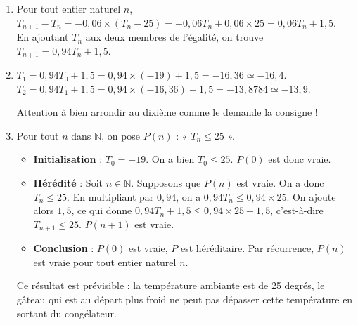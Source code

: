 \documentclass[11pt,fleqn, openany]{book} %
\begin{document}
\begin{solution}\hspace{0pt}
\begin{enumerate}
\item Pour tout entier naturel $n$,$ T_{n+1} - T_n = -0,06 \times (T_n - 25)=-0,06T_n+0,06 \times 25 = 0,06T_n+1,5$.\\
En ajoutant $T_n$ aux deux membres de l'égalité, on trouve $T_{n+1}=0,94T_n+1,5$.
\item $T_1=0,94T_0+1,5=0,94 \times (-19) +1,5=-16,36 \simeq -16,4$. \\ $T_2=0,94T_1+1,5=0,94 \times (-16,36)+1,5=-13,8784\simeq -13,9$.

Attention à bien arrondir au dixième comme le demande la consigne !

\item Pour tout $n$ dans $\mathbb{N}$, on pose $P(n)$ : « $T_n \leqslant 25$ ».

\begin{itemize}
\item \textbf{Initialisation} : $T_0=-19$. On a bien $T_0 \leqslant 25$. $P(0)$ est donc vraie.
\item \textbf{Hérédité} : Soit $n\in\mathbb{N}$. Supposons que $P(n)$ est vraie. On a donc $T_n \leqslant 25$. En multipliant par $0,94$, on a $0,94T_n \leqslant 0,94 \times 25$. On ajoute alors $1,5$, ce qui donne $0,94T_n +1,5\leqslant 0,94 \times 25+1,5$, c'est-à-dire $T_{n+1}\leqslant 25$. $P(n+1)$ est vraie.
\item \textbf{Conclusion} : $P(0)$ est vraie, $P$ est héréditaire. Par récurrence, $P(n)$ est vraie pour tout entier naturel $n$.
\end{itemize}
Ce résultat est prévisible : la température ambiante est de 25 degrés, le gâteau qui est au départ plus froid ne peut pas dépasser cette température en sortant du congélateur.


\end{enumerate}
\end{solution}
\end{document}
